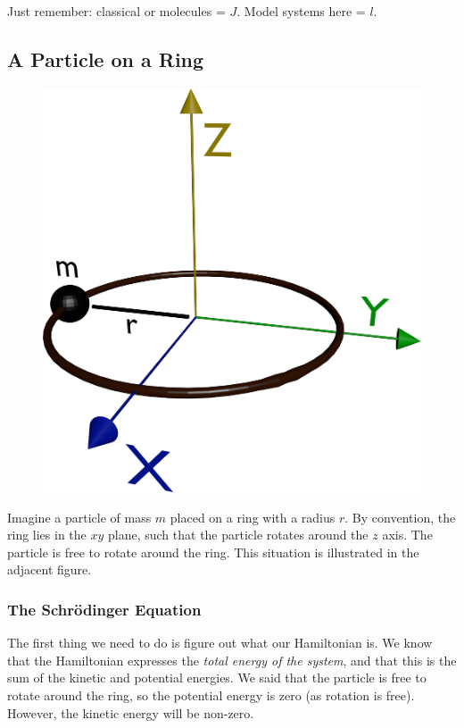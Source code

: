 \documentclass{memoir}[11pt,oneside,a4paper,openany]
\begin{document}
Just remember: classical or molecules = $J$. Model systems here = $l$.
\subsection{A Particle on a Ring}
\begin{figure}
	\centering
	\includegraphics[width=\linewidth]{particle_on_a_ring}
\end{figure}
Imagine a particle of mass $m$ placed on a ring with a radius $r$. By convention, the ring lies in the $xy$ plane, such that the particle rotates around the $z$ axis. The particle is free to rotate around the ring. This situation is illustrated in the adjacent figure.

\subsubsection{The Schr{\"o}dinger Equation}
The first thing we need to do is figure out what our Hamiltonian is. We know that the Hamiltonian expresses the \emph{total energy of the system}, and that this is the sum of the kinetic and potential energies. We said that the particle is free to rotate around the ring, so the potential energy is zero (as rotation is free). However, the kinetic energy will be non-zero. 
\end{document}
